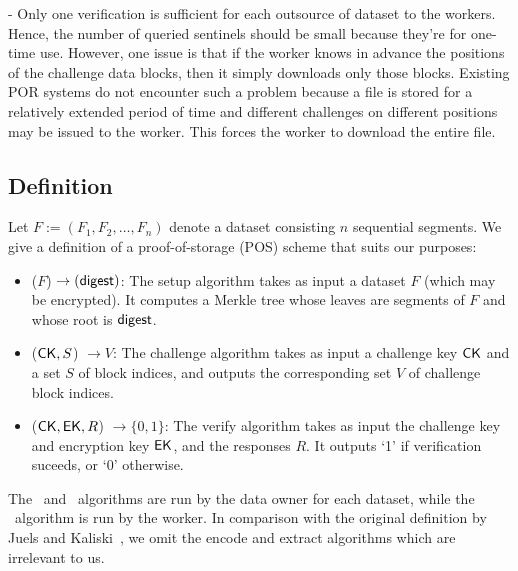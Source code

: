 - Only one verification is sufficient for each outsource of dataset to the workers. Hence, the number of queried sentinels should be small because they're for one-time use. However, one issue is that if the worker knows in advance the positions of the challenge data blocks, then it simply downloads only those blocks. Existing POR systems do not encounter such a problem because a file is stored for a relatively extended period of time and different challenges on different positions may be issued to the worker. This forces the worker to download the entire file.

\subsection{Definition} \label{sect:pos-definition}

Let $F := (F_1,F_2,\dotsc,F_n)$ denote a dataset consisting $n$ sequential segments.
We give a definition of a proof-of-storage (POS) scheme that suits our purposes:
\begin{itemize}

\item \Setup($F$) $\rightarrow (\textsf{\textup{digest}})$: The setup algorithm takes as input a dataset $F$ (which may be encrypted). It computes a Merkle tree whose leaves are segments of $F$ and whose root is $\textsf{\textup{digest}}$.

\item \Prove($\textsf{\textup{CK}}, S$) $\rightarrow V$: The challenge algorithm takes as input a challenge key $\textsf{\textup{CK}}$ and a set $S$ of block indices, and outputs the corresponding set $V$ of challenge block indices.

\item \Verify($\textsf{\textup{CK}}, \textsf{\textup{EK}}, R$) $\rightarrow \{0,1\}$: The verify algorithm takes as input the challenge key and encryption key $\textsf{\textup{EK}}$, and the responses $R$. It outputs `1' if verification suceeds, or `0' otherwise.
\end{itemize}

The \Setup~and \Verify~algorithms are run by the data owner for each dataset, while the \Prove~algorithm is run by the worker.
In comparison with the original definition by Juels and Kaliski~\cite{JK07}, we omit the encode and extract algorithms which are irrelevant to us.


